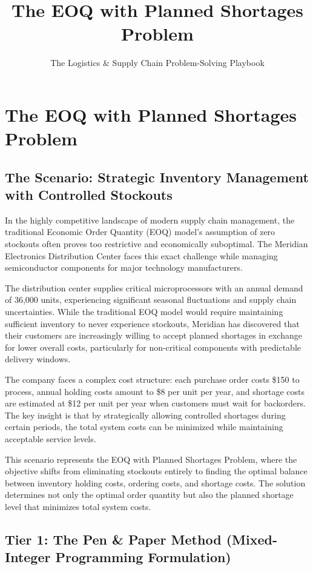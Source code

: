 \documentclass{article}
\title{The EOQ with Planned Shortages Problem}
\author{The Logistics \& Supply Chain Problem-Solving Playbook}
\date{}
\begin{document}
\maketitle

\section{The EOQ with Planned Shortages Problem}

\subsection{The Scenario: Strategic Inventory Management with Controlled Stockouts}

In the highly competitive landscape of modern supply chain management, the traditional Economic Order Quantity (EOQ) model's assumption of zero stockouts often proves too restrictive and economically suboptimal. The Meridian Electronics Distribution Center faces this exact challenge while managing semiconductor components for major technology manufacturers.

The distribution center supplies critical microprocessors with an annual demand of 36,000 units, experiencing significant seasonal fluctuations and supply chain uncertainties. While the traditional EOQ model would require maintaining sufficient inventory to never experience stockouts, Meridian has discovered that their customers are increasingly willing to accept planned shortages in exchange for lower overall costs, particularly for non-critical components with predictable delivery windows.

The company faces a complex cost structure: each purchase order costs \$150 to process, annual holding costs amount to \$8 per unit per year, and shortage costs are estimated at \$12 per unit per year when customers must wait for backorders. The key insight is that by strategically allowing controlled shortages during certain periods, the total system costs can be minimized while maintaining acceptable service levels.

This scenario represents the EOQ with Planned Shortages Problem, where the objective shifts from eliminating stockouts entirely to finding the optimal balance between inventory holding costs, ordering costs, and shortage costs. The solution determines not only the optimal order quantity but also the planned shortage level that minimizes total system costs.

\subsection{Tier 1: The Pen \& Paper Method (Mixed-Integer Programming Formulation)}
\end{document}
